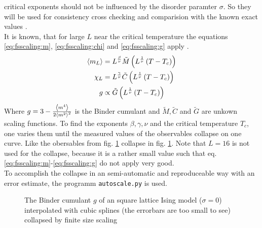    critical exponents should not be influenced by the disorder paramter
    \(\sigma\). So they will be used for consistency cross checking and
    comparision with the known exact values \cite[S. 59]{Pelissetto2002}.\\
    It is known, that for large \(L\) near the critical temperature the
    equations \eqref{eq:fsscaling:m}, \eqref{eq:fsscaling:chi} and
    \eqref{eq:fsscaling:g} apply \cite[p. 145f]{Katzgraber2011}.
    \begin{align}
        \label{eq:fsscaling:m}
        \left< m_L \right> &= L^\frac{\beta}{\nu} \tilde{M}\left(L^\frac{1}{\nu}\left(T-T_c\right)\right)\\
        \label{eq:fsscaling:chi}
        \chi_L    &= L^\frac{\gamma}{\nu} \tilde{C}\left(L^\frac{1}{\nu}\left(T-T_c\right)\right)\\
        \label{eq:fsscaling:g}
        g         &\propto \tilde{G}\left(L^\frac{1}{\nu}\left(T-T_c\right)\right)
    \end{align}
    Where \(g = 3-\frac{\left< m^4 \right>}{2\left< m^2 \right>^2}\) \cite{Binder1981} is
    the Binder cumulant and \(\tilde{M}, \tilde{C}\) and \(\tilde{G}\)
    are unkown scaling functions. To find the exponents
    \(\beta, \gamma, \nu\) and the critical temperature \(T_c\), one
    varies them until the measured values of the observables collapse on
    one curve. Like the obersables from fig. \ref{fig:gettingCrit}
    collapse in fig. \ref{fig:gettingCrit}.
    Note that \(L=16\) is not used for the collapse, because it is a
    rather small value such that eq. \eqref{eq:fsscaling:m}-\eqref{eq:fsscaling:g}
    do not apply very good.\\
    To accomplish the collapse in an semi-automatic and reproduceable
    way with an error estimate, the programm
    \texttt{autoscale.py} \cite{autoscale2009} is used.
    \begin{figure}[htbp]
        \centering
        \caption[Examples of determining critical temperature and exponents]
        {
            The Binder cumulant \(g\) of an square lattice Ising model
            (\(\sigma=0\))\\
             interpolated
                with cubic splines (the errorbars are too small to see)\\
             collapsed by finite
                size scaling
        }
        \label{fig:gettingCrit}
    \end{figure}\\
